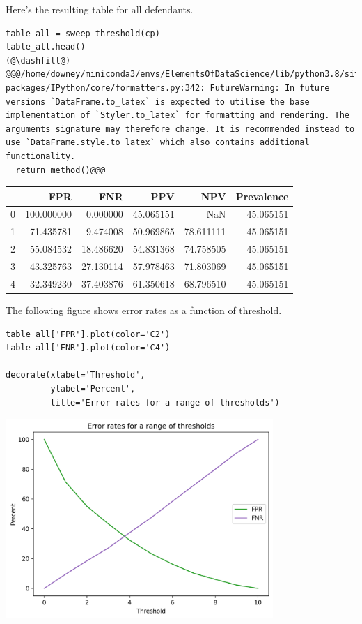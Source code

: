 Here's the resulting table for all defendants.

\begin{lstlisting}[]
table_all = sweep_threshold(cp)
table_all.head()
(@\dashfill@)
@@@/home/downey/miniconda3/envs/ElementsOfDataScience/lib/python3.8/site-packages/IPython/core/formatters.py:342: FutureWarning: In future versions `DataFrame.to_latex` is expected to utilise the base implementation of `Styler.to_latex` for formatting and rendering. The arguments signature may therefore change. It is recommended instead to use `DataFrame.style.to_latex` which also contains additional functionality.
  return method()@@@
\end{lstlisting}

\begin{tabular}{lrrrrr}
\midrule
{} &         FPR &        FNR &        PPV &        NPV &  Prevalence \\
\midrule
0 &  100.000000 &   0.000000 &  45.065151 &        NaN &   45.065151 \\
1 &   71.435781 &   9.474008 &  50.969865 &  78.611111 &   45.065151 \\
2 &   55.084532 &  18.486620 &  54.831368 &  74.758505 &   45.065151 \\
3 &   43.325763 &  27.130114 &  57.978463 &  71.803069 &   45.065151 \\
4 &   32.349230 &  37.403876 &  61.350618 &  68.796510 &   45.065151 \\
\midrule
\end{tabular}

The following figure shows error rates as a function of threshold.

\begin{lstlisting}[]
table_all['FPR'].plot(color='C2')
table_all['FNR'].plot(color='C4')

decorate(xlabel='Threshold', 
         ylabel='Percent',
         title='Error rates for a range of thresholds')
\end{lstlisting}

\begin{center}
\includegraphics[width=4in]{chapters/02_calibration_files/02_calibration_36_0.png}
\end{center}

